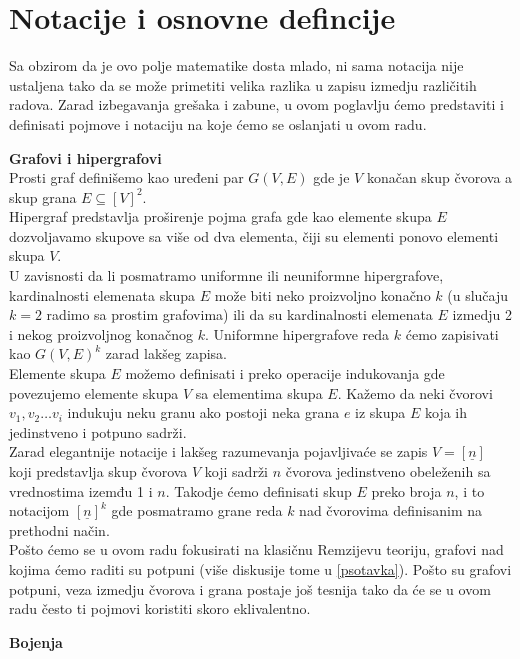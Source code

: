 \documentclass[a4paper]{article}
\begin{document}
	\section{Notacije i osnovne defincije}
	Sa obzirom da je ovo polje matematike dosta mlado, ni sama notacija nije ustaljena tako da se može primetiti velika razlika u zapisu izmedju različitih radova. Zarad izbegavanja grešaka i zabune, u ovom poglavlju ćemo predstaviti i definisati pojmove i notaciju na koje ćemo se oslanjati u ovom radu.
	\newline
	\begin{description}
		\item \textbf{Grafovi i hipergrafovi}\\
		Prosti graf definišemo kao uređeni par $G(V,E)$ gde je $V$ konačan skup čvorova a skup grana $E\subseteq[V]^2$. \\
		Hipergraf predstavlja proširenje pojma grafa gde kao elemente skupa $E$ dozvoljavamo skupove sa više od dva elementa, čiji su elementi ponovo elementi skupa $V$.\\ U zavisnosti da li posmatramo uniformne ili neuniformne hipergrafove, kardinalnosti elemenata skupa $E$ može biti neko proizvoljno konačno $k$ (u slučaju $k=2$ radimo sa prostim grafovima) ili da su kardinalnosti elemenata $E$ izmedju 2 i nekog proizvoljnog konačnog $k$. Uniformne hipergrafove reda $k$ ćemo zapisivati kao $G(V, E)^k$ zarad lakšeg zapisa. \\
		Elemente skupa $E$ možemo definisati i preko operacije indukovanja gde povezujemo elemente skupa $V$ sa elementima skupa $E$. Kažemo da neki čvorovi $v_1, v_2 \dots v_i$ indukuju neku granu ako postoji neka grana $e$ iz skupa $E$ koja ih jedinstveno i potpuno sadrži. \\%
		Zarad elegantnije notacije i lakšeg razumevanja pojavljivaće se zapis $V=[\underline{n}]$ koji predstavlja skup čvorova $V$ koji sadrži $n$ čvorova jedinstveno obeleženih sa vrednostima izemđu 1 i $n$. Takodje ćemo definisati skup $E$ preko broja $n$, i to notacijom $[\underline{n}]^k$ gde posmatramo grane reda $k$ nad čvorovima definisanim na prethodni način.
		\\
		Pošto ćemo se u ovom radu fokusirati na klasičnu Remzijevu teoriju, grafovi nad kojima ćemo raditi su potpuni (više diskusije  tome u \ref{psotavka}). Pošto su grafovi potpuni, veza izmedju čvorova i grana postaje još tesnija tako da će se u ovom radu često ti pojmovi koristiti skoro eklivalentno. \\
		\item \textbf{Bojenja} \\

\end{description}
\end{document}
